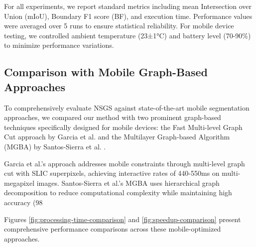 \documentclass[conference]{IEEEtran}
\begin{document}
For all experiments, we report standard metrics including mean Intersection over Union (mIoU), Boundary F1 score (BF), and execution time. Performance values were averaged over 5 runs to ensure statistical reliability. For mobile device testing, we controlled ambient temperature (23±1°C) and battery level (70-90\%) to minimize performance variations.

\subsection{Comparison with Mobile Graph-Based Approaches}
To comprehensively evaluate NSGS against state-of-the-art mobile segmentation approaches, we compared our method with two prominent graph-based techniques specifically designed for mobile devices: the Fast Multi-level Graph Cut approach by Garcia et al. \cite{Garcia2015} and the Multilayer Graph-based Algorithm (MGBA) by Santos-Sierra et al. \cite{Santos2014}.

Garcia et al.'s approach addresses mobile constraints through multi-level graph cut with SLIC superpixels, achieving interactive rates of 440-550ms on multi-megapixel images. Santos-Sierra et al.'s MGBA uses hierarchical graph decomposition to reduce computational complexity while maintaining high accuracy (98%

Figures \ref{fig:processing-time-comparison} and \ref{fig:speedup-comparison} present comprehensive performance comparisons across these mobile-optimized approaches.
\end{document}
